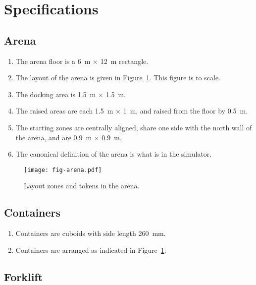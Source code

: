\section{Specifications}
\label{sec:specs}

\subsection{Arena}
\label{spec:arena}

\begin{enumerate}
  \item The arena floor is a \SI{6}{m} $\times$ \SI{12}{m} rectangle.
  \item The layout of the arena is given in Figure~\ref{fig:arena}. This
        figure is to scale.
  \item The docking area is \SI{1.5}{m} $\times$ \SI{1.5}{m}.
  \item The raised areas are each \SI{1.5}{m} $\times$ \SI{1}{m}, and raised
        from the floor by \SI{0.5}{m}.
  \item The starting zones are centrally aligned, share one side with the
        north wall of the arena, and are \SI{0.9}{m} $\times$ \SI{0.9}{m}.
  \item The canonical definition of the arena is what is in the simulator.
\end{enumerate}

\begin{figure}
  \centering
  \texttt{[image: fig-arena.pdf]}
  \caption{Layout zones and tokens in the arena.}
  \label{fig:arena}
\end{figure}

\subsection{Containers}
\label{spec:containers}

\begin{enumerate}
  \item Containers are cuboids with side length \SI{260}{mm}.
  \item Containers are arranged as indicated in Figure~\ref{fig:arena}.
\end{enumerate}

\subsection{Forklift}
\label{spec:forklift}


